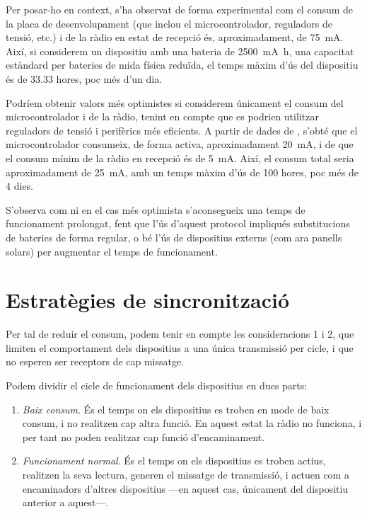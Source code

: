 \documentclass{tfgitic}[2024/07/01]
\begin{document}
{Per posar-ho en context, s'ha observat de forma experimental com el consum de la placa de desenvolupament (que inclou el microcontrolador, reguladors de tensió, etc.) i de la ràdio en estat de recepció és, aproximadament, de \SI{75}{\milli\ampere}. Així, si considerem un dispositiu amb una bateria de \SI{2500}{\milli\ampere\hour}, una capacitat estàndard per bateries de mida física reduïda, el temps màxim d'ús del dispositiu és de 33.33 hores, poc més d'un dia.

Podríem obtenir valors més optimistes si considerem únicament el consum del microcontrolador i de la ràdio, tenint en compte que es podrien utilitzar reguladors de tensió i perifèrics més eficients. A partir de dades de \cite{espressif_current_nodate}, s'obté que el microcontrolador consumeix, de forma activa, aproximadament \SI{20}{\milli\ampere}, i de \cite{semtech_sx1262_nodate} que el consum mínim de la ràdio en recepció és de \SI{5}{\milli\ampere}. Així, el consum total seria aproximadament de \SI{25}{\milli\ampere}, amb un temps màxim d'ús de 100 hores, poc més de 4 dies.

S'observa com ni en el cas més optimista s'aconsegueix una temps de funcionament prolongat, fent que l'ús d'aquest protocol impliqués substitucions de bateries de forma regular, o bé l'ús de dispositius externs (com ara panells solars) per augmentar el temps de funcionament. 

\section{Estratègies de sincronització}
Per tal de reduir el consum, podem tenir en compte les consideracions 1 i 2, que limiten el comportament dels dispositius a una única transmissió per cicle, i que no esperen ser receptors de cap missatge. 

Podem dividir el cicle de funcionament dels dispositius en dues parts:
\begin{enumerate}
    \item \emph{Baix consum}. És el temps on els dispositius es troben en mode de baix consum, i no realitzen cap altra funció. En aquest estat la ràdio no funciona, i per tant no poden realitzar cap funció d'encaminament.
    \item \emph{Funcionament normal}. És el temps on els dispositius es troben actius, realitzen la seva lectura, generen el missatge de transmissió, i actuen com a encaminadors d'altres dispositius ---en aquest cas, únicament del dispositiu anterior a aquest---. 
\end{enumerate}

}
\end{document}
